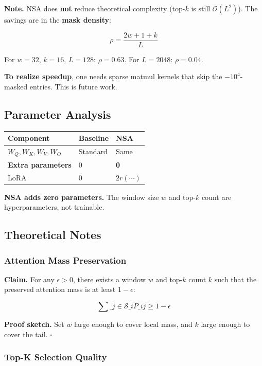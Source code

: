 \textbf{Note.} NSA does \textbf{not} reduce theoretical complexity (top-$k$ is still 
$\mathcal{O}(L^2)$). The savings are in the \textbf{mask density}:

\[
\rho = \frac{2w + 1 + k}{L}
\tag{4.9}
\]

For $w = 32$, $k = 16$, $L = 128$: $\rho = 0.63$.
For $L = 2048$: $\rho = 0.04$.

\textbf{To realize speedup}, one needs sparse matmul kernels that skip the 
$-10^4$-masked entries. This is future work.

\subsection{Parameter Analysis}

\begin{table}[H]
\centering
\small
\begin{tabular}{lll}
\toprule
\textbf{Component} & \textbf{Baseline} & \textbf{NSA} \\
\midrule
$W_Q, W_K, W_V, W_O$ & Standard & Same \\
\textbf{Extra parameters} & 0 & \textbf{0} \\
LoRA & 0 & $2 r (\cdots)$ \\
\bottomrule
\end{tabular}
\end{table}

\textbf{NSA adds zero parameters.} The window size $w$ and top-$k$ count are 
hyperparameters, not trainable.

\subsection{Theoretical Notes}

\subsubsection{Attention Mass Preservation}

\textbf{Claim.} For any $\epsilon > 0$, there exists a window $w$ and top-$k$ 
count $k$ such that the preserved attention mass is at least $1 - \epsilon$:

\[
\sum\_{j \in \mathcal{S}\_i} P\_{ij} \geq 1 - \epsilon
\tag{4.10}
\]

\textbf{Proof sketch.} Set $w$ large enough to cover local mass, and $k$ large 
enough to cover the tail. $\square$

\subsubsection{Top-K Selection Quality}


